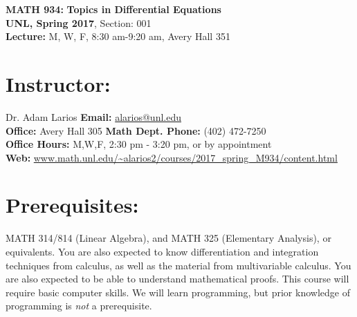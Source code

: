 \documentclass[margin]{res}
\theoremstyle{plain}
\theoremstyle{definition}
\theoremstyle{remark}
\begin{document}
\begin{center}
   \textbf{MATH 934:} 
   \textbf{Topics in Differential Equations}\\
   \textbf{UNL, Spring 2017}, Section: 001%
    \\
   \textbf{Lecture:} M, W, F, 8:30 am-9:20 am, Avery Hall 351\\
\end{center}
%
\vspace{-0.2in}
%
\begin{resume}
\section{Instructor:} Dr. Adam Larios 
\hfill \textbf{Email:} 
\url{alarios@unl.edu}
\\
\textbf{Office:} Avery Hall 305
\hfill
\textbf{Math Dept. Phone:} (402) 472-7250
\\
\textbf{Office Hours:} M,W,F, 2:30 pm - 3:20 pm, or by appointment
\hfill
\\
\textbf{Web:} \url{www.math.unl.edu/~alarios2/courses/2017_spring_M934/content.html}



 \section{Prerequisites:} MATH 314/814 (Linear Algebra), and MATH 325 (Elementary Analysis), or equivalents.  You are also expected to know differentiation and integration techniques from calculus, as well as the material from multivariable calculus.   You are also expected to be able to understand mathematical proofs.  This course will require basic computer skills.  We will learn programming, but prior knowledge of programming is \textit{not} a prerequisite.
 
 
 

\end{resume}
\end{document}
